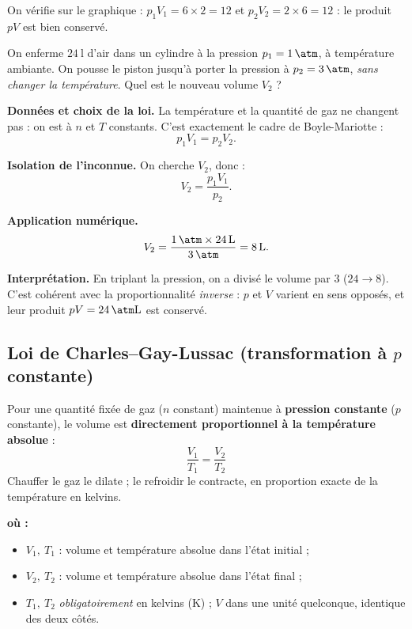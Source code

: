 \documentclass[11pt,a4paper]{article}
\newenvironment{ou}{%
  \par\smallskip\noindent\textbf{où :}\nopagebreak
  \begin{itemize}[leftmargin=1.8em,topsep=2pt,itemsep=1.5pt,parsep=0pt]}%
  {\end{itemize}}
\begin{document}
\noindent On vérifie sur le graphique : $p_1V_1=6\times2=\num{12}$ et $p_2V_2=2\times6=\num{12}$ : le
produit $pV$ est bien conservé.

\begin{exemple}
On enferme $\qty{24}{\litre}$ d'air dans un cylindre à la pression $p_1=\qty{1}{\atm}$, à température
ambiante. On pousse le piston jusqu'à porter la pression à $p_2=\qty{3}{\atm}$, \emph{sans changer la
température}. Quel est le nouveau volume $V_2$ ?

\smallskip
\textbf{Données et choix de la loi.} La température et la quantité de gaz ne changent pas : on est à
$n$ et $T$ constants. C'est exactement le cadre de Boyle-Mariotte :
\[ p_1 V_1 = p_2 V_2. \]

\textbf{Isolation de l'inconnue.} On cherche $V_2$, donc :
\[ V_2 = \frac{p_1 V_1}{p_2}. \]

\textbf{Application numérique.}
\[ V_2 = \frac{\qty{1}{\atm}\times\qty{24}{\litre}}{\qty{3}{\atm}}
       = \qty{8}{\litre}. \]

\textbf{Interprétation.} En triplant la pression, on a divisé le volume par $3$ ($24\to8$). C'est
cohérent avec la proportionnalité \emph{inverse} : $p$ et $V$ varient en sens opposés, et leur produit
$pV=\qty{24}{\atm\litre}$ est conservé.
\end{exemple}

\subsection{Loi de Charles--Gay-Lussac (transformation à \texorpdfstring{$p$}{p} constante)}

\begin{theoreme}
Pour une quantité fixée de gaz ($n$ constant) maintenue à \textbf{pression constante} ($p$ constante),
le volume est \textbf{directement proportionnel à la température absolue} :
\[ \boxed{\,\frac{V_1}{T_1}=\frac{V_2}{T_2}\,} \]
Chauffer le gaz le dilate ; le refroidir le contracte, en proportion exacte de la température en
kelvins.
\end{theoreme}

\begin{ou}
  \item $V_1,\ T_1$ : volume et température absolue dans l'état initial ;
  \item $V_2,\ T_2$ : volume et température absolue dans l'état final ;
  \item $T_1,\ T_2$ \emph{obligatoirement} en kelvins (\si{\kelvin}) ; $V$ dans une unité quelconque,
        identique des deux côtés.
\end{ou}
\end{document}
